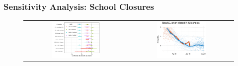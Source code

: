 \documentclass{beamer}
\begin{document}
\begin{frame}
  \frametitle{Sensitivity Analysis: School Closures}
  
  
  \begin{figure}[ht]
  \begin{minipage}{\linewidth}
    \centering
    \begin{tabular}{cc}
      \includegraphics[width=0.49\textwidth]{tables_and_figures/pk12-whisker-14}
      &
      \includegraphics[width=0.49\textwidth]{tables_and_figures/pk12-cases-14}\qquad
    \end{tabular}
  \end{minipage} %
\end{figure}


\end{frame}
\end{document}
